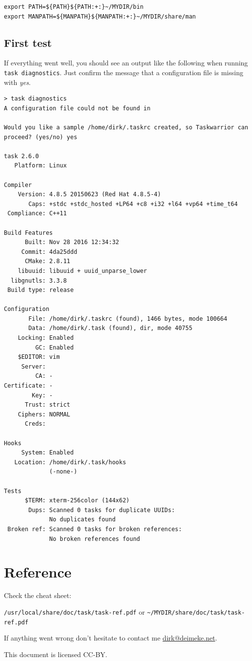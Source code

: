\documentclass[DIV=12,fontsize=12pt,parskip=half,paper=portrait,%
               headheight=61pt,headinclude=yes,%
               footheight=15pt,footinclude=no]{scrartcl}
\begin{document}
\begin{lstlisting}
export PATH=${PATH}${PATH:+:}~/MYDIR/bin
export MANPATH=${MANPATH}${MANPATH:+:}~/MYDIR/share/man\end{lstlisting}

\subsection{First test}

If everything went well, you should see an output like the following when running \texttt{task diagnostics}. Just confirm the message that a configuration file is missing with \textit{yes}.

\begin{lstlisting}
> task diagnostics
A configuration file could not be found in

Would you like a sample /home/dirk/.taskrc created, so Taskwarrior can proceed? (yes/no) yes

task 2.6.0
   Platform: Linux

Compiler
    Version: 4.8.5 20150623 (Red Hat 4.8.5-4)
       Caps: +stdc +stdc_hosted +LP64 +c8 +i32 +l64 +vp64 +time_t64
 Compliance: C++11

Build Features
      Built: Nov 28 2016 12:34:32
     Commit: 4da25ddd
      CMake: 2.8.11
    libuuid: libuuid + uuid_unparse_lower
  libgnutls: 3.3.8
 Build type: release

Configuration
       File: /home/dirk/.taskrc (found), 1466 bytes, mode 100664
       Data: /home/dirk/.task (found), dir, mode 40755
    Locking: Enabled
         GC: Enabled
    $EDITOR: vim
     Server:
         CA: -
Certificate: -
        Key: -
      Trust: strict
    Ciphers: NORMAL
      Creds:

Hooks
     System: Enabled
   Location: /home/dirk/.task/hooks
             (-none-)

Tests
      $TERM: xterm-256color (144x62)
       Dups: Scanned 0 tasks for duplicate UUIDs:
             No duplicates found
 Broken ref: Scanned 0 tasks for broken references:
             No broken references found\end{lstlisting}

\section{Reference}

Check the cheat sheet:

\texttt{/usr/local/share/doc/task/task-ref.pdf} or \texttt{\textasciitilde/MYDIR/share/doc/task/task-ref.pdf}

If anything went wrong don't hesitate to contact me \href{mailto:dirk@deimeke.net}{dirk@deimeke.net}.

This document is licensed CC-BY.
\end{document}

